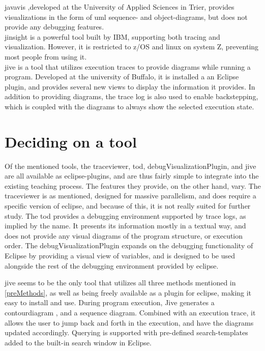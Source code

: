 \Gls{javavis} \cite{Oechsle2002},developed at the University of Applied Sciences in Trier, provides visualizations in the form of \gls{uml} sequence- and object-diagrams, but does not provide any debugging features.
~\\

\Gls{jinsight} \cite{Pauw} is a powerful tool built by IBM, supporting both tracing and visualization.
However, it is restricted to z/OS and linux on system Z, preventing most people from using it.
~\\

\Gls{jive} is a tool that utilizes execution traces to provide diagrams while running a program.
Developed at the university of Buffalo, it is installed a an Eclipse plugin, and provides several new views to display the information it provides.
In addition to providing diagrams, the trace log is also used to enable backstepping, which is coupled with the diagrams to always show the selected execution state.
~\\

\section{Deciding on a tool}\label{preDiscuss}
Of the mentioned tools, the \gls{traceviewer}, \gls{tod}, \gls{debugVisualizationPlugin}, and \gls{jive} are all available as eclipse-plugins, and are thus fairly simple to integrate into the existing teaching process.
The features they provide, on the other hand, vary.
The \gls{traceviewer} is as mentioned, designed for massive parallelism, and does require a specific version of eclipse, and because of this, it is not really suited for further study.%
The \gls{tod} provides a debugging environment supported by trace logs, as implied by the name.
It presents its information mostly in a textual way, and does not provide any visual diagrams of the program structure, or execution order.
The \gls{debugVisualizationPlugin} expands on the debugging functionality of Eclipse by providing a visual view of variables, and is designed to be used alongside the rest of the debugging environment provided by eclipse.
~\\

\begin{sloppypar}
\Gls{jive} seems to be the only tool that utilizes all three methods mentioned in \autoref{preMethods}, as well as being freely available as a plugin for eclipse, making it easy to install and use.
During program execution, Jive generates a \gls{contourdiagram} \cite{Jayaraman1996}, and a sequence diagram.
Combined with an execution trace, it allows the user to jump back and forth in the execution, and have the diagrams updated accordingly.
Querying is supported with pre-defined search-templates added to the built-in search window in Eclipse.
~\\
\end{sloppypar}

